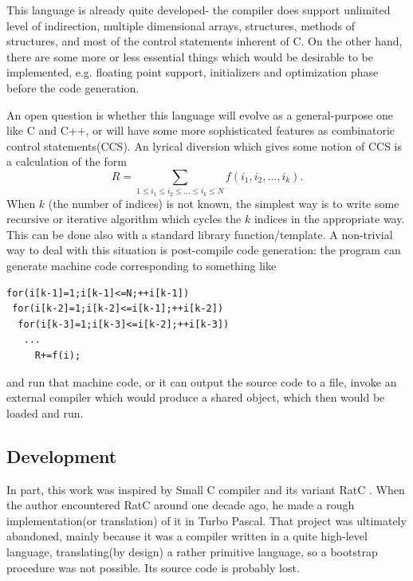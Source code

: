 \documentclass[10pt]{article}
\def\be{\begin{equation}}
\def\ee{\end{equation}}
\begin{document}
This language is already quite developed- the compiler does support
unlimited level of indirection, multiple dimensional arrays, structures,
methods of structures, and most of the control statements inherent of
C. On the other hand, there are some more or less essential things which
would be desirable to be implemented, e.g. floating point support,
initializers and optimization phase before the code generation. 

An open question is whether this language will evolve as a
general-purpose one like C and C++, or will have some more sophisticated
features as combinatoric control statements(CCS). An lyrical diversion
which gives 
some notion of CCS is a calculation of the form
\be
R=\sum_{1\le i_1\le i_2\le\ldots\le i_k\le N}f(i_1,i_2,\ldots,i_k).
\ee
When $k$ (the number of indices) is not known, the simplest way is to
write some recursive or iterative algorithm which cycles the $k$ indices
in the appropriate way. This can be done also with a standard library
function/template. A non-trivial way to deal with this situation is
post-compile code generation: the program can generate machine code
corresponding to something like
\begin{verbatim}
for(i[k-1]=1;i[k-1]<=N;++i[k-1])
 for(i[k-2]=1;i[k-2]<=i[k-1];++i[k-2])
  for(i[k-3]=1;i[k-3]<=i[k-2];++i[k-3])
   ...
     R+=f(i);
\end{verbatim}
and run that machine code, or it can output the source code to a file,
invoke an external compiler which would produce a shared object, which
then would be loaded and run.
\subsection{Development}
In part, this work was inspired by  Small C compiler \cite{SmCfiles} and
its variant RatC \cite{ABookOnC}. When the author encountered RatC
around one decade ago, he made a rough implementation(or translation) of it
in Turbo Pascal. That project was ultimately abandoned, mainly because
it was a compiler written in a quite high-level language, translating(by
design) a rather primitive language, so a bootstrap procedure was not
possible. Its source code is probably lost. 
\end{document}
